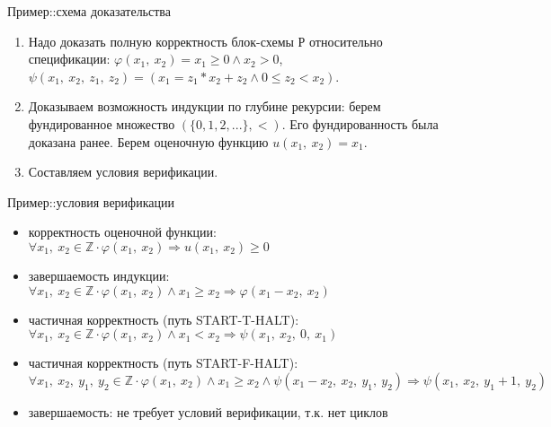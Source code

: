 \documentclass[hyperref={unicode=true}]{beamer}
\begin{document}
    \begin{frame}{Пример::схема доказательства}
    \begin{enumerate}
    \item
    Надо доказать полную корректность блок-схемы Р относительно
    спецификации: $\varphi(x_1,~x_2) = x_1 \geq 0 \land x_2 > 0$,
    $\psi(x_1,~x_2,~z_1,~z_2) = (x_1 = z_1 * x_2 + z_2 \land 0 \leq z_2 < x_2)$.

    \item
    Доказываем возможность индукции по глубине рекурсии:
    берем фундированное множество $(\{0, 1, 2, ...\}, <)$. Его фундированность
    была доказана ранее. Берем оценочную функцию $u(x_1,~x_2) = x_1$.

    \item
    Составляем условия верификации.
    \end{enumerate}
    \end{frame}

    \begin{frame}{Пример::условия верификации}
    \begin{itemize}
    \item корректность оценочной функции:
            $\forall x_1,~x_2 \in \mathbb{Z} \cdot
            \varphi(x_1,~x_2)
            \Rightarrow
            u(x_1,~x_2) \geq 0$
    \item завершаемость индукции:
            $\forall x_1,~x_2 \in \mathbb{Z} \cdot
            \varphi(x_1,~x_2) \land x_1 \geq x_2
            \Rightarrow
            \varphi(x_1 - x_2,~x_2)$
    \item частичная корректность (путь START-T-HALT):
            $\forall x_1,~x_2 \in \mathbb{Z} \cdot
            \varphi(x_1,~x_2) \land x_1 < x_2
            \Rightarrow
            \psi(x_1,~x_2,~0,~x_1)$
    \item частичная корректность (путь START-F-HALT):
            $\forall x_1,~x_2,~y_1,~y_2 \in \mathbb{Z} \cdot
            \varphi(x_1,~x_2) \land x_1 \geq x_2 \land
            \psi(x_1 - x_2,~x_2,~y_1,~y_2)
            \Rightarrow
            \psi(x_1,~x_2,~y_1 + 1,~y_2)$
    \item завершаемость: не требует условий верификации, т.к. нет циклов
    \end{itemize}
    \end{frame}
\end{document}
